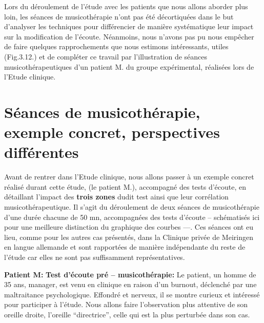 Lors du déroulement de l'étude avec les patients que nous allons aborder plus loin, les séances 
de
musicothérapie n'ont pas été
décortiquées dans le but d'analyser les techniques pour différencier de manière systématique  leur  
impact sur la 
modification de 
l'écoute.
Néanmoins, nous n'avons pas pu nous empêcher  de faire quelques rapprochements que nous 
estimons 
intéressants, utiles (Fig.3.12.) et de compléter ce travail par l'illustration de séances 
musicothérapeutiques d'un 
patient M. du groupe expérimental, réalisées lors de l'Etude clinique.

 \clearpage



\section{ Séances de musicothérapie, exemple concret, perspectives différentes}

Avant de rentrer dans l'Etude clinique, nous allons passer à un exemple concret réalisé durant cette 
étude, 
(le patient M.), accompagné des tests d'écoute, en détaillant 
l'impact
des\textbf{ trois zones} dudit test ainsi que  leur corrélation musicothérapeutique.
Il s'agit du  déroulement de deux séances de
musicothérapie d'une durée chacune  de 50 mn,  accompagnées des tests d'écoute --  
schématisés ici pour une meilleure 
distinction du graphique des courbes ---. Ces séances ont eu lieu, comme pour les autres cas 
présentés, dans la Clinique privée de Meiringen en langue allemande et sont rapportées de
manière indépendante du reste de l'étude car elles ne sont pas
suffisamment représentatives.

\textbf{Patient M:}
\textbf{ Test d'écoute pré -- musicothérapie:}
Le patient, un homme de 35 ans, manager,  est venu en clinique en raison d'un burnout, déclenché par 
une maltraitance psychologique. Effondré et nerveux, il  se montre curieux et 
intéressé pour participer à l'étude. Nous allons faire
l'observation plus attentive de
son oreille droite, l'oreille ``directrice'',
celle qui est la plus perturbée dans son cas.


